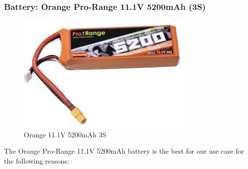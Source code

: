 \documentclass[12pt]{report}
\begin{document}
      \subsubsection{\large Battery: Orange Pro-Range 11.1V 5200mAh (3S)} 
      \begin{figure}
        \includegraphics[width=1\linewidth]{battery.png}
        \caption{Orange 11.1V 5200mAh 3S}
        \label{fig:battery3s}
      \end{figure}
     
      The Orange Pro-Range 11.1V 5200mAh battery is the best for our use case for the following reasons: \\
\end{document}

